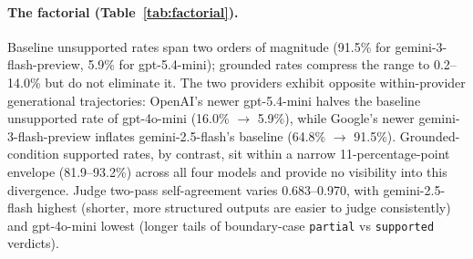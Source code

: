 \documentclass[11pt]{article}
\begin{document}
\paragraph{The factorial (Table~\ref{tab:factorial}).}
Baseline unsupported rates span two orders of magnitude (91.5\% for gemini-3-flash-preview, 5.9\% for gpt-5.4-mini); grounded rates compress the range to 0.2--14.0\% but do not eliminate it. The two providers exhibit opposite within-provider generational trajectories: OpenAI's newer gpt-5.4-mini halves the baseline unsupported rate of gpt-4o-mini (16.0\% $\to$ 5.9\%), while Google's newer gemini-3-flash-preview inflates gemini-2.5-flash's baseline (64.8\% $\to$ 91.5\%). Grounded-condition supported rates, by contrast, sit within a narrow 11-percentage-point envelope (81.9--93.2\%) across all four models and provide no visibility into this divergence. Judge two-pass self-agreement varies 0.683--0.970, with gemini-2.5-flash highest (shorter, more structured outputs are easier to judge consistently) and gpt-4o-mini lowest (longer tails of boundary-case \texttt{partial} vs \texttt{supported} verdicts).

\begin{table}[!t]
\centering
\small
\setlength{\tabcolsep}{4pt}
\caption{STACHE diagnostic panel. HDI is the Hallucination Dependence Index (Eq.~\ref{eq:hdi}): the fraction of ungrounded hallucination suppressed by the grounded architecture. Overlap@0.80 is the fraction of grounded claims with a semantic twin in the same patient's baseline (cosine $\geq 0.80$, via text-embedding-3-small). Max-sim is the mean, over grounded claims, of the highest cosine similarity to any baseline claim for that patient.}
\label{tab:panel}
\end{table}
\end{document}
